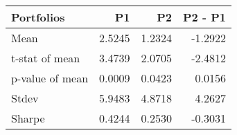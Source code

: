 \begin{tabular}{lrrr}
\toprule
Portfolios & P1 & P2 & P2 - P1 \\
\midrule
Mean & 2.5245 & 1.2324 & -1.2922 \\
t-stat of mean & 3.4739 & 2.0705 & -2.4812 \\
p-value of mean & 0.0009 & 0.0423 & 0.0156 \\
Stdev & 5.9483 & 4.8718 & 4.2627 \\
Sharpe & 0.4244 & 0.2530 & -0.3031 \\
\bottomrule
\end{tabular}

